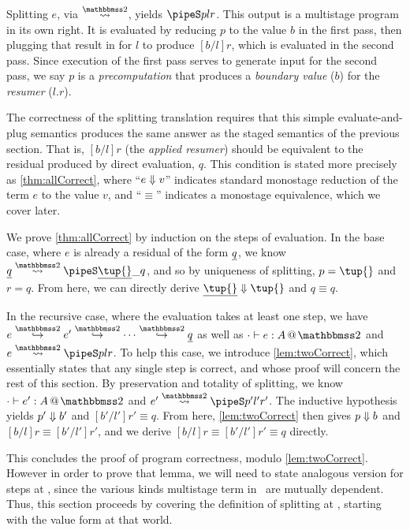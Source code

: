 \begin{abstrsyn}
Splitting $e$, via $\splittwosym$, yields $\pipeS p l r$.
This output is a multistage program in its own right.
It is evaluated by reducing $p$ to the value $b$ in the first pass,
then plugging that result in for $l$ to produce $[b/l]r$,
which is evaluated in the second pass.
Since execution of the first pass serves to generate input for
the second pass, we say $p$ is a {\em precomputation} that produces a
{\em boundary value} ($b$) for the {\em resumer} ($l.r$).

The correctness of the splitting translation requires that this simple 
evaluate-and-plug semantics produces the same answer as the staged semantics of the previous section.
That is, $[b/l]r$ (the \emph{applied resumer}) should be equivalent 
to the residual produced by direct evaluation, $q$.
This condition is stated more precisely as \ref{thm:allCorrect},
where ``${e} \Downarrow {v}$'' indicates standard monostage reduction of the term $e$ to the value $v$,
and ``$\equiv$'' indicates a monostage equivalence, which we cover later.

We prove \ref{thm:allCorrect} by induction on the steps of evaluation.  
In the base case, where $e$ is already a residual of the form $\underline{q}$, we know
$\splittwo {\exv q} A {\exv{\tup{}}} \_ q$, and so by uniqueness of splitting, 
$p = \tup{}$ and $r = q$.
From here, we can directly derive $\reduce {\exv {\tup {}}} {\tup {}}$ and $q \equiv q$.

In the recursive case, where the evaluation takes at least one step, we have 
$e \stepsym \bbtwo e' \stepsym \bbtwo \cdots \stepsym \bbtwo \exv q$
as well as \mbox{$\typestwo [\cdot] e A$} 
and \mbox{$\splittwo e A p l r$}.
To help this case, we introduce \ref{lem:twoCorrect}, 
which essentially states that any single step is correct,
and whose proof will concern the rest of this section.
By preservation and totality of splitting, we know $\typestwo [\cdot] {e'} A$ and $\splittwo {e'} A {p'} {l'} {r'}$.
The inductive hypothesis yields ${p'} \Downarrow {b'}$ and $[b'/l']r' \equiv q$.
From here, \ref{lem:twoCorrect} then gives ${p} \Downarrow {b}$ and $[b/l]r \equiv [b'/l']r'$,
and we derive $[b/l]r \equiv [b'/l']r' \equiv q$ directly.

This concludes the proof of program correctness, modulo \ref{lem:twoCorrect}.
However in order to prove that lemma, 
we will need to state analogous version for steps at \bbonem,
since the various kinds multistage term in \lang\ are mutually dependent.
Thus, this section proceeds by covering the definition of splitting at \bbonem, 
starting with the value form at that world.


\end{abstrsyn}
